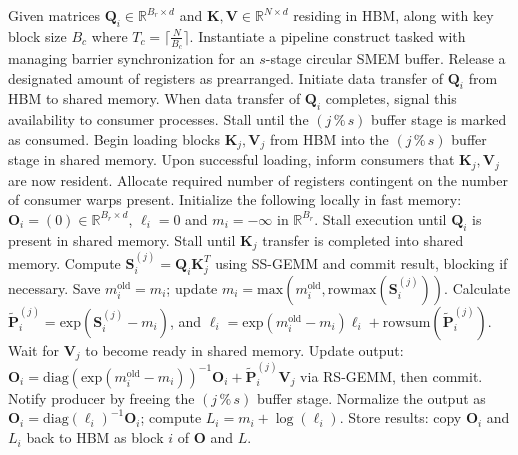 \begin{algorithm}[H]
    \caption{\small\label{alg:flash3_wgmma_ws_only}\textsc{FlashAttention-3} Forward Pass \textbf{Excluding} Intra-consumer Overlap -- CTA Perspective}
    \begin{algorithmic}[1]
\REQUIRE Given matrices $\mathbf{Q}_i \in \mathbb{R}^{B_r \times d}$ and $\mathbf{K}, \mathbf{V} \in \mathbb{R}^{N \times d}$ residing in HBM, along with key block size $B_c$ where $T_c = \lceil \frac{N}{B_c} \rceil$.
\STATE Instantiate a pipeline construct tasked with managing barrier synchronization for an $s$-stage circular SMEM buffer.
\STATE Release a designated amount of registers as prearranged.
\STATE Initiate data transfer of $\mathbf{Q}_i$ from HBM to shared memory.
\STATE When data transfer of $\mathbf{Q}_i$ completes, signal this availability to consumer processes.
    \STATE Stall until the $(j\,\%\,s)$ buffer stage is marked as consumed.
    \STATE Begin loading blocks $\mathbf{K}_j, \mathbf{V}_j$ from HBM into the $(j\,\%\,s)$ buffer stage in shared memory.
    \STATE Upon successful loading, inform consumers that $\mathbf{K}_j, \mathbf{V}_j$ are now resident.
\ENDFOR
\ELSE \STATE Allocate required number of registers contingent on the number of consumer warps present.
\STATE Initialize the following locally in fast memory: $\mathbf{O}_i = (0) \in \mathbb{R}^{B_r \times d}$, $\ell_i = 0$ and $m_i = -\infty$ in $\mathbb{R}^{B_r}$.
\STATE Stall execution until $\mathbf{Q}_i$ is present in shared memory.
\STATE Stall until $\mathbf{K}_j$ transfer is completed into shared memory.
\STATE Compute $\mathbf{S}_i^{(j)} = \mathbf{Q}_i \mathbf{K}_j^T$ using SS-GEMM and commit result, blocking if necessary. \label{alg:ws_only_gemm1}
\STATE Save $m_i^{\mathrm{old}} = m_i$; update $m_i = \mathrm{max}(m_i^{\mathrm{old}}, \mathrm{rowmax}(\mathbf{S}_i^{(j)}))$. \label{code-ws:softmax_start}
\STATE Calculate $\widetilde{\mathbf{P}}_i^{(j)} = \mathrm{exp}(\mathbf{S}_i^{(j)} - m_i)$, and $\ell_i = \mathrm{exp}(m_i^{\mathrm{old}} - m_i) \ell_i + \mathrm{rowsum}(\widetilde{\mathbf{P}}_i^{(j)})$. \label{code-ws:softmax_end}
\STATE Wait for $\mathbf{V}_j$ to become ready in shared memory.
\STATE Update output: $\mathbf{O}_i = \mathrm{diag}(\mathrm{exp}(m_i^{\mathrm{old}} - m_i))^{-1} \mathbf{O}_i + \widetilde{\mathbf{P}}_i^{(j)} \mathbf{V}_j$ via RS-GEMM, then commit. \label{alg:ws_only_gemm2}
\STATE Notify producer by freeing the $(j\,\%\,s)$ buffer stage.
\ENDFOR
\STATE Normalize the output as $\mathbf{O}_i = \mathrm{diag}(\ell_i)^{-1} \mathbf{O}_i$; compute $L_i = m_i + \log(\ell_i)$.
\STATE Store results: copy $\mathbf{O}_i$ and $L_i$ back to HBM as block $i$ of $\mathbf{O}$ and $L$.
\ENDIF
\end{algorithmic}
\end{algorithm}

